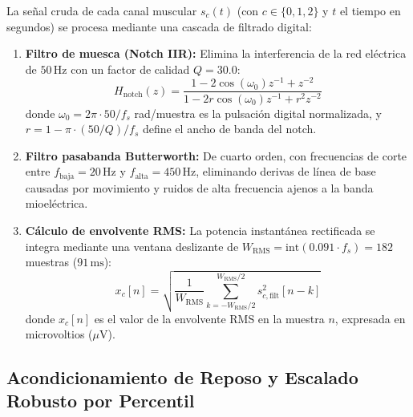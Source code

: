 \documentclass[11pt,a4paper,openany]{book}
\theoremstyle{definition}
\begin{document}
La señal cruda de cada canal muscular $s_c(t)$ (con $c \in \{0, 1, 2\}$ y $t$ el tiempo en segundos) se procesa mediante una cascada de filtrado digital:
\begin{enumerate}
    \item \textbf{Filtro de muesca (Notch IIR):} Elimina la interferencia de la red eléctrica de $50\,\text{Hz}$ con un factor de calidad $Q = 30.0$:
    \begin{equation}
        H_{\text{notch}}(z) = \frac{1 - 2\cos(\omega_0) z^{-1} + z^{-2}}{1 - 2 r \cos(\omega_0) z^{-1} + r^2 z^{-2}}
    \end{equation}
    donde $\omega_0 = 2\pi \cdot 50 / f_s$ rad/muestra es la pulsación digital normalizada, y $r = 1 - \pi \cdot (50/Q) / f_s$ define el ancho de banda del notch.
    \item \textbf{Filtro pasabanda Butterworth:} De cuarto orden, con frecuencias de corte entre $f_{\text{baja}} = 20\,\text{Hz}$ y $f_{\text{alta}} = 450\,\text{Hz}$, eliminando derivas de línea de base causadas por movimiento y ruidos de alta frecuencia ajenos a la banda mioeléctrica.
    \item \textbf{Cálculo de envolvente RMS:} La potencia instantánea rectificada se integra mediante una ventana deslizante de $W_{\text{RMS}} = \text{int}(0.091 \cdot f_s) = 182$ muestras ($91\,\text{ms}$):
    \begin{equation}
        x_c[n] = \sqrt{\frac{1}{W_{\text{RMS}}} \sum_{k = -W_{\text{RMS}}/2}^{W_{\text{RMS}}/2} s_{c,\text{filt}}^2[n - k]}
    \end{equation}
    donde $x_c[n]$ es el valor de la envolvente RMS en la muestra $n$, expresada en microvoltios ($\mu\text{V}$).
\end{enumerate}

\subsection{Acondicionamiento de Reposo y Escalado Robusto por Percentil}
\label{subsec:acondicionamiento_reposo}
\end{document}
